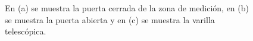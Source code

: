 \begin{figure}[H]
\begin{minipage}[b]{0.35\textwidth}
    \end{minipage}
    
    \caption{En (a) se muestra la puerta cerrada de la zona de medición, en (b) se muestra la puerta abierta y en (c) se muestra la varilla telescópica.}
    \label{fig:tunelExterno}
\end{figure}

